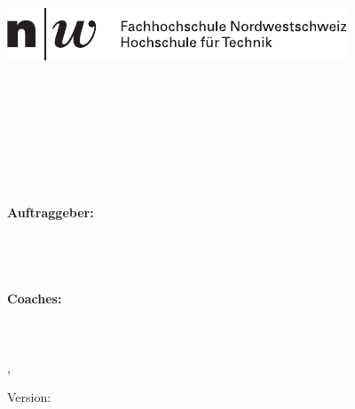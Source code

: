 \thispagestyle{plain}

\begin{titlepage}
	\begin{flushleft}
		\vspace*{0cm}
		\hspace{0cm} \includegraphics{images/fhnw_logo_full}\\		
		\vspace{1.5cm}
		\textbf{
			\hspace{-0.12cm}\LARGE{\doctype}\\
			\Huge{\titel}\\
			\vspace{2.0cm}
			\vfill
			\vfill
			\vspace{2.0cm}
			\large{\team\\\autorA \\\autorB \\\autorC \\\autorD}\\
			}
		\vspace{1cm}
		\vfill
		\large{
			\paragraph{Auftraggeber:} \mbox{}\\
			\dozent \\
			 
			\paragraph{Coaches:} \mbox{}\\
			\betreuer \\
			\vspace{0.75cm}
			\ort, \datum
		}
		\hfill Version: \version
	\end{flushleft}
\end{titlepage}
